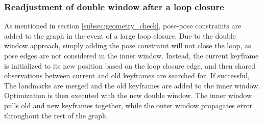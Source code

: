 \subsubsection{Readjustment of double window after a loop closure}
As mentioned in section \ref{subsec:geometry_check}, pose-pose constraints are added to the graph in the event of a large loop closure. Due to the double window approach, simply adding the pose constraint will not close the loop, as pose edges are not considered in the inner window.  Instead, the current keyframe is initialized to its new position based on the loop closure edge, and then shared observations between current and old keyframes are searched for.  If successful, The landmarks are merged and the old keyframes are added to the inner window.  Optimization is then executed with the new double window.  The inner window pulls old and new keyframes together, while the outer window propagates error throughout the rest of the graph.


%

